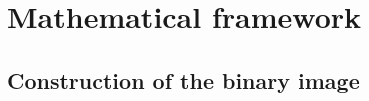 \documentclass[12pt]{article}
\renewcommand{\hat}{\widehat}
\theoremstyle{Theorem}
\theoremstyle{definition}
\begin{document}
\begin{comment}
\end{equation*}
\begin{equation*}
r=\sqrt{\hat{x}^{2} + \hat{y}^{2}}, \; \hspace{1cm} \; \hat{\Phi} = \begin{cases} \arctan{\frac{\hat{y}}{\hat{x}}} \hspace{0.5cm} \text{if} \; \hat{x} > 0 , \\
180 + \arctan{\frac{\hat{y}}{\hat{x}}} \hspace{0.5cm} \text{if} \; \hat{x} < 0 
\end{cases}
\end{equation*}
By using standard ellipse, they can compute the direction of maximum variability in a direction of angle $\theta$. So, they are able to describe the spatial behavior of the mean vectors, quantifying by the calculation of $\theta$ the direction of maximum variability.
\end{comment} 

\section{Mathematical framework}\label{section1}
\subsection{Construction of the binary image}\label{construction}
\end{document}
